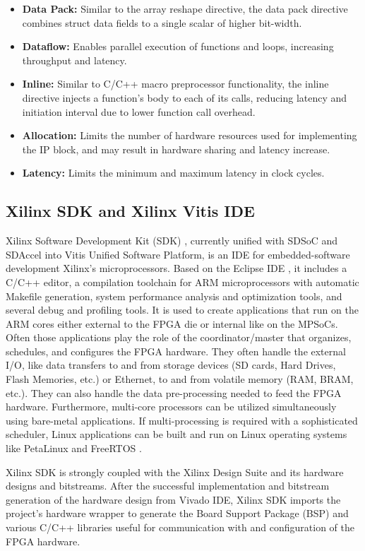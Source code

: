 \begin{itemize}
	\item \textbf{Data Pack:} Similar to the array reshape directive, the data pack directive combines struct data fields to a single scalar of higher bit-width.
	\item \textbf{Dataflow:} Enables parallel execution of functions and loops, increasing throughput and latency.
	\item \textbf{Inline:} Similar to C/C++ macro preprocessor functionality, the inline directive injects a function's body to each of its calls, reducing latency and initiation interval due to lower function call overhead.
	\item \textbf{Allocation:} Limits the number of hardware resources used for implementing the IP block, and may result in hardware sharing and latency increase.
	\item \textbf{Latency:} Limits the minimum and maximum latency in clock cycles.
\end{itemize}

\subsection{Xilinx SDK and Xilinx Vitis IDE}
Xilinx Software Development Kit (SDK) \cite{Xilinx-SDK}, currently unified with SDSoC and SDAccel into Vitis Unified Software Platform, is an IDE for embedded-software development Xilinx's microprocessors. Based on the Eclipse IDE \cite{Eclipse-IDE}, it includes a C/C++ editor, a compilation toolchain for ARM microprocessors with automatic Makefile generation, system performance analysis and optimization tools, and several debug and profiling tools. It is used to create applications that run on the ARM cores either external to the FPGA die or internal like on the MPSoCs. Often those applications play the role of the coordinator/master that organizes, schedules, and configures the FPGA hardware. They often handle the external I/O, like data transfers to and from storage devices (SD cards, Hard Drives, Flash Memories, etc.) or Ethernet, to and from volatile memory (RAM, BRAM, etc.). They can also handle the data pre-processing needed to feed the FPGA hardware. Furthermore, multi-core processors can be utilized simultaneously using bare-metal applications. If multi-processing is required with a sophisticated scheduler, Linux applications can be built and run on Linux operating systems like PetaLinux \cite{PetaLinux} and FreeRTOS \cite{FreeRTOS}.

Xilinx SDK is strongly coupled with the Xilinx Design Suite and its hardware designs and bitstreams. After the successful implementation and bitstream generation of the hardware design from Vivado IDE, Xilinx SDK imports the project's hardware wrapper to generate the Board Support Package (BSP) and various C/C++ libraries useful for communication with and configuration of the FPGA hardware.

